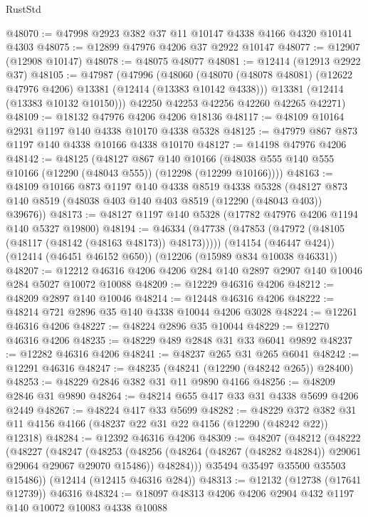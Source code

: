 \begin{lexlean}{RustStd}
\begin{coremodule}
{\begin{coremodule}
{{{{{{{{{{{{{{{{{{{{{{{{{{{{{{{{{{{{{{{{{{{{{{{{{{@48070 := @47998 @2923 @382 @37 @11 @10147 @4338 @4166 @4320 @10141 @4303
@48075 := @12899 @47976 @4206 @37 @2922 @10147
@48077 := @12907 (@12908 @10147)
@48078 := @48075 @48077
@48081 := @12414 (@12913 @2922 @37)
@48105 := @47987
    (@47996
      (@48060
        (@48070 (@48078 @48081) (@12622 @47976 @4206) @13381 (@12414 (@13383 @10142 @4338)))
        @13381
        (@12414 (@13383 @10132 @10150)))
      @42250
      @42253
      @42256
      @42260
      @42265
      @42271)
@48109 := @18132 @47976 @4206 @4206 @18136
@48117 := @48109 @10164 @2931 @1197 @140 @4338 @10170 @4338 @5328
@48125 := @47979 @867 @873 @1197 @140 @4338 @10166 @4338 @10170
@48127 := @14198 @47976 @4206
@48142 := @48125
    (@48127
      @867
      @140
      @10166
      (@48038 @555 @140 @555 @10166 (@12290 (@48043 @555)) (@12298 (@12299 @10166))))
@48163 := @48109
    @10166
    @873
    @1197
    @140
    @4338
    @8519
    @4338
    @5328
    (@48127 @873 @140 @8519 (@48038 @403 @140 @403 @8519 (@12290 (@48043 @403)) @39676))
@48173 := @48127 @1197 @140 @5328 (@17782 @47976 @4206 @1194 @140 @5327 @19800)
@48194 := @46334
    (@47738 (@47853 (@47972 (@48105 (@48117 (@48142 (@48163 @48173)) @48173)))))
    (@14154 (@46447 @424))
    (@12414 (@46451 @46152 @650))
    (@12206 (@15989 @834 @10038 @46331))
@48207 := @12212 @46316 @4206 @4206 @284 @140 @2897 @2907 @140 @10046 @284 @5027 @10072 @10088
@48209 := @12229 @46316 @4206
@48212 := @48209 @2897 @140 @10046
@48214 := @12448 @46316 @4206
@48222 := @48214 @721 @2896 @35 @140 @4338 @10044 @4206 @3028
@48224 := @12261 @46316 @4206
@48227 := @48224 @2896 @35 @10044
@48229 := @12270 @46316 @4206
@48235 := @48229 @489 @2848 @31 @33 @6041 @9892
@48237 := @12282 @46316 @4206
@48241 := @48237 @265 @31 @265 @6041
@48242 := @12291 @46316
@48247 := @48235 (@48241 (@12290 (@48242 @265)) @28400)
@48253 := @48229 @2846 @382 @31 @11 @9890 @4166
@48256 := @48209 @2846 @31 @9890
@48264 := @48214 @655 @417 @33 @31 @4338 @5699 @4206 @2449
@48267 := @48224 @417 @33 @5699
@48282 := @48229
    @372
    @382
    @31
    @11
    @4156
    @4166
    (@48237 @22 @31 @22 @4156 (@12290 (@48242 @22)) @12318)
@48284 := @12392 @46316 @4206
@48309 := @48207
    (@48212
      (@48222
        (@48227
          (@48247
            (@48253
              (@48256 (@48264 (@48267 (@48282 @48284)) @29061 @29064 @29067 @29070 @15486))
              @48284)))
        @35494
        @35497
        @35500
        @35503
        @15486))
    (@12414 (@12415 @46316 @284))
@48313 := @12132 (@12738 (@17641 @12739)) @46316
@48324 := @18097 @48313 @4206 @4206 @2904 @432 @1197 @140 @10072 @10083 @4338 @10088
}}}}}}}}}}}}}}}}}}}}}}}}}}}}}}}}}}}}}}}}}}}}}}}}}}
\end{coremodule}}
\end{coremodule}
\end{lexlean}

